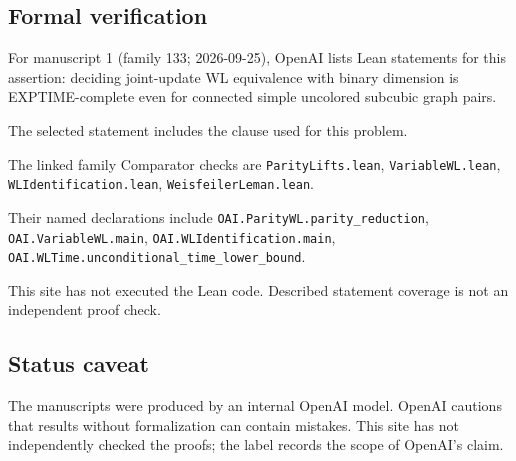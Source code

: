 \documentclass[11pt]{article}
\begin{document}
\subsection{Formal verification}
For manuscript 1 (family 133; 2026-09-25), OpenAI lists Lean statements for this assertion: deciding joint-update WL equivalence with binary dimension is EXPTIME-complete even for connected simple uncolored subcubic graph pairs.

The selected statement includes the clause used for this problem.

The linked family Comparator checks are \texttt{ParityLifts.lean}, \texttt{VariableWL.lean}, \texttt{WLIdentification.lean}, \texttt{WeisfeilerLeman.lean}.

Their named declarations include \texttt{OAI.ParityWL.parity\_reduction}, \texttt{OAI.VariableWL.main}, \texttt{OAI.WLIdentification.main}, \texttt{OAI.WLTime.unconditional\_time\_lower\_bound}.

This site has not executed the Lean code. Described statement coverage is not an independent proof check.

\subsection{Status caveat}
The manuscripts were produced by an internal OpenAI model. OpenAI cautions that results without formalization can contain mistakes. This site has not independently checked the proofs; the label records the scope of OpenAI's claim.
\end{document}
